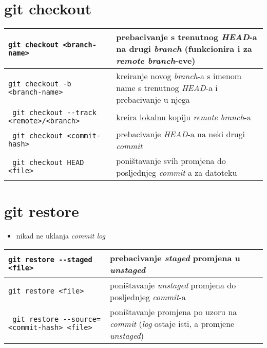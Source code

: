 \documentclass[10pt]{article}
\begin{document}
    \section*{git checkout}
    \begin{tabular}{|>{\tt}p{9.00cm}|>{}p{15.50cm}|}
        \hline
        git checkout <branch-name>                      & prebacivanje s trenutnog \textit{HEAD}-a na drugi \textit{branch} (funkcionira i za \textit{remote branch}-eve) \\ \hline
        git checkout -b <branch-name>                   & kreiranje novog \textit{branch}-a s imenom name s trenutnog \textit{HEAD}-a i prebacivanje u njega \\ \hline
        git checkout -{}-track <remote>/<branch>          & kreira lokalnu kopiju \textit{remote branch}-a \\ \hline
        git checkout <commit-hash>                      & prebacivanje \textit{HEAD}-a na neki drugi \textit{commit} \\ \hline
        git checkout HEAD <file>                        & poništavanje svih promjena do posljednjeg \textit{commit}-a za datoteku \\ \hline
    \end{tabular}

    \section*{git restore}
    \begin{itemize}
        \item nikad ne uklanja \textit{commit log}
    \end{itemize}
    \begin{tabular}{|>{\tt}p{9.00cm}|>{}p{15.50cm}|}
        \hline
        git restore -{}-staged <file>                     & prebacivanje \textit{staged} promjena u \textit{unstaged} \\ \hline
        git restore <file>                              & poništavanje \textit{unstaged} promjena do posljednjeg \textit{commit}-a \\ \hline
        git restore -{}-source=<commit-hash> <file>       & poništavanje promjena po uzoru na \textit{commit} (\textit{log} ostaje isti, a promjene \textit{unstaged}) \\ \hline
    \end{tabular}
\end{document}
